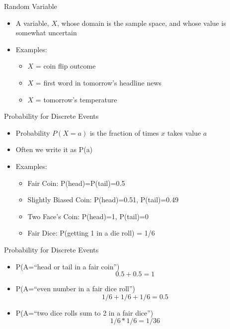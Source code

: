 \documentclass{beamer}
\begin{document}
\begin{frame}{Random Variable}
    \begin{itemize}
        \item A variable, $X$, whose domain is the sample space, and whose value is somewhat uncertain
        \item Examples:
        \begin{itemize}
            \item $X$ = coin flip outcome
            \item $X$ = first word in tomorrow's headline news
            \item $X$ = tomorrow's temperature 
        \end{itemize}
    \end{itemize}
\end{frame}

\begin{frame}{Probability for Discrete Events}
    \begin{itemize}
        \item Probability $P(X=a)$ is the fraction of times $x$ takes value $a$
        \item Often we write it as P(a)
        \item Examples:
        \begin{itemize}
            \item Fair Coin: P(head)=P(tail)=0.5
            \item Slightly Biased Coin: P(head)=0.51, P(tail)=0.49
            \item Two Face's Coin: P(head)=1, P(tail)=0
            \item Fair Dice: P(getting 1 in a die roll) = 1/6
        \end{itemize}
    \end{itemize}
\end{frame}

\begin{frame}{Probability for Discrete Events}
    \begin{itemize}
        \item P(A=``head or tail in a fair coin'') $$0.5 + 0.5 = 1$$
        \item P(A=``even number in a fair dice roll'') $$1/6 + 1/6 + 1/6 = 0.5$$
        \item P(A=``two dice rolls sum to 2 in a fair dice'') $$1/6 * 1/6 = 1/36$$
    \end{itemize}
\end{frame}
\end{document}
